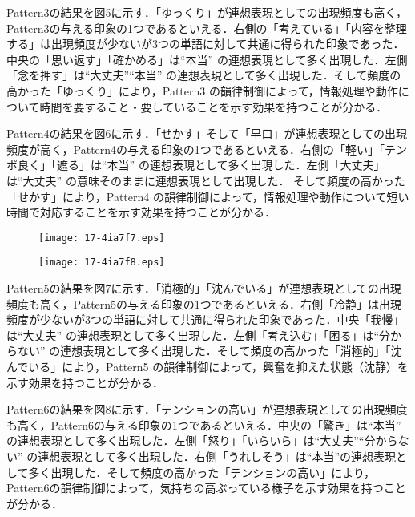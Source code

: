 \documentclass[japanese]{jnlp_1.4}
\begin{document}
Pattern3の結果を図5に示す．「ゆっくり」が連想表現としての出現頻度も高く，Pattern3の与える印象の1つであるといえる．右側の「考えている」「内容を整理する」は出現頻度が少ないが3つの単語に対して共通に得られた印象であった．中央の「思い返す」「確かめる」は“本当” の連想表現として多く出現した．左側「念を押す」は“大丈夫”“本当” の連想表現として多く出現した．そして頻度の高かった「ゆっくり」により，Pattern3 の韻律制御によって，情報処理や動作について時間を要すること・要していることを示す効果を持つことが分かる．

Pattern4の結果を図6に示す．「せかす」そして「早口」が連想表現としての出現頻度が高く，Pattern4の与える印象の1つであるといえる．右側の「軽い」「テンポ良く」「遮る」は“本当” の連想表現として多く出現した．左側「大丈夫」は“大丈夫” の意味そのままに連想表現として出現した．
そして頻度の高かった「せかす」により，Pattern4 の韻律制御によって，情報処理や動作について短い時間で対応することを示す効果を持つことが分かる．

\begin{figure}[b]
\setlength{\captionwidth}{0.45\textwidth}
 \begin{minipage}{0.45\textwidth}
  \begin{center}
 \texttt{[image: 17-4ia7f7.eps]}
  \end{center}
  \label{fig:five}
 \end{minipage}
\hfill
 \begin{minipage}{0.45\textwidth}
  \begin{center}
 \texttt{[image: 17-4ia7f8.eps]}
  \end{center}
  \label{fig:six}
 \end{minipage}
\end{figure}


Pattern5の結果を図7に示す．「消極的」「沈んでいる」が連想表現としての出現頻度も高く，Pattern5の与える印象の1つであるといえる．右側「冷静」は出現頻度が少ないが3つの単語に対して共通に得られた印象であった．中央「我慢」は“大丈夫” の連想表現として多く出現した．左側「考え込む」「困る」は“分からない” の連想表現として多く出現した．そして頻度の高かった「消極的」「沈んでいる」により，Pattern5 の韻律制御によって，興奮を抑えた状態（沈静）を示す効果を持つことが分かる．

Pattern6の結果を図8に示す．「テンションの高い」が連想表現としての出現頻度も高く，Pattern6の与える印象の1つであるといえる．中央の「驚き」は“本当” の連想表現として多く出現した．左側「怒り」「いらいら」は“大丈夫”“分からない” の連想表現として多く出現した．右側「うれしそう」は“本当”の連想表現として多く出現した．そして頻度の高かった「テンションの高い」により，Pattern6の韻律制御によって，気持ちの高ぶっている様子を示す効果を持つことが分かる．
\end{document}
